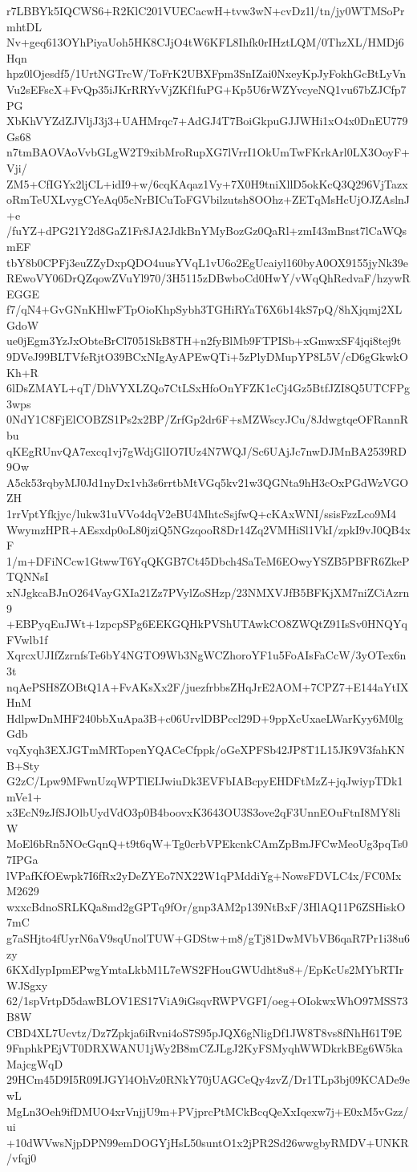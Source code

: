 r7LBBYk5IQCWS6+R2KlC201VUECacwH+tvw3wN+cvDz1l/tn/jy0WTMSoPrmhtDL
Nv+geq613OYhPiyaUoh5HK8CJjO4tW6KFL8Ihfk0rIHztLQM/0ThzXL/HMDj6Hqn
hpz0lOjesdf5/1UrtNGTrcW/ToFrK2UBXFpm3SnIZai0NxeyKpJyFokhGcBtLyVn
Vu2sEFscX+FvQp35iJKrRRYvVjZKf1fuPG+Kp5U6rWZYvcyeNQ1vu67bZJCfp7PG
XbKhVYZdZJVljJ3j3+UAHMrqc7+AdGJ4T7BoiGkpuGJJWHi1xO4x0DnEU779Gs68
n7tmBAOVAoVvbGLgW2T9xibMroRupXG7lVrrI1OkUmTwFKrkArl0LX3OoyF+Vji/
ZM5+CfIGYx2ljCL+idI9+w/6cqKAqaz1Vy+7X0H9tniXllD5okKcQ3Q296VjTazx
oRmTeUXLvygCYeAq05cNrBICuToFGVbilzutsh8OOhz+ZETqMsHcUjOJZAslnJ+e
/fuYZ+dPG21Y2d8GaZ1Fr8JA2JdkBnYMyBozGz0QaRl+zmI43mBnst7lCaWQsmEF
tbY8b0CPFj3euZZyDxpQDO4uusYVqL1vU6o2EgUcaiyl160byA0OX9155jyNk39e
REwoVY06DrQZqowZVuYl970/3H5115zDBwboCd0HwY/vWqQhRedvaF/hzywREGGE
f7/qN4+GvGNnKHlwFTpOioKhpSybh3TGHiRYaT6X6b14kS7pQ/8hXjqmj2XLGdoW
ue0jEgm3YzJxObteBrCl7051SkB8TH+n2fyBlMb9FTPISb+xGmwxSF4jqi8tej9t
9DVeJ99BLTVfeRjtO39BCxNIgAyAPEwQTi+5zPlyDMupYP8L5V/cD6gGkwkOKh+R
6lDsZMAYL+qT/DhVYXLZQo7CtLSxHfoOnYFZK1cCj4Gz5BtfJZI8Q5UTCFPg3wps
0NdY1C8FjElCOBZS1Ps2x2BP/ZrfGp2dr6F+sMZWscyJCu/8JdwgtqeOFRannRbu
qKEgRUnvQA7excq1vj7gWdjGlIO7IUz4N7WQJ/Sc6UAjJc7nwDJMnBA2539RD9Ow
A5ck53rqbyMJ0Jd1nyDx1vh3s6rrtbMtVGq5kv21w3QGNta9hH3cOxPGdWzVGOZH
1rrVptYfkjyc/lukw31uVVo4dqV2eBU4MhtcSsjfwQ+cKAxWNI/ssisFzzLco9M4
WwymzHPR+AEsxdp0oL80jziQ5NGzqooR8Dr14Zq2VMHiSl1VkI/zpkI9vJ0QB4xF
1/m+DFiNCcw1GtwwT6YqQKGB7Ct45Dbch4SaTeM6EOwyYSZB5PBFR6ZkePTQNNsI
xNJgkcaBJnO264VayGXIa21Zz7PVylZoSHzp/23NMXVJfB5BFKjXM7niZCiAzrn9
+EBPyqEuJWt+1zpcpSPg6EEKGQHkPVShUTAwkCO8ZWQtZ91IsSv0HNQYqFVwlb1f
XqrcxUJIfZzrnfsTe6bY4NGTO9Wb3NgWCZhoroYF1u5FoAIsFaCcW/3yOTex6n3t
nqAePSH8ZOBtQ1A+FvAKsXx2F/juezfrbbsZHqJrE2AOM+7CPZ7+E144aYtIXHnM
HdlpwDnMHF240bbXuApa3B+c06UrvlDBPccl29D+9ppXcUxaeLWarKyy6M0lgGdb
vqXyqh3EXJGTmMRTopenYQACeCfppk/oGeXPFSb42JP8T1L15JK9V3fahKNB+Sty
G2zC/Lpw9MFwnUzqWPTlEIJwiuDk3EVFbIABcpyEHDFtMzZ+jqJwiypTDk1mVe1+
x3EcN9zJfSJOlbUydVdO3p0B4boovxK3643OU3S3ove2qF3UnnEOuFtnI8MY8liW
MoEl6bRn5NOcGqnQ+t9t6qW+Tg0crbVPEkcnkCAmZpBmJFCwMeoUg3pqTs07IPGa
lVPafKfOEwpk7I6fRx2yDeZYEo7NX22W1qPMddiYg+NowsFDVLC4x/FC0MxM2629
wxxcBdnoSRLKQa8md2gGPTq9fOr/gnp3AM2p139NtBxF/3HlAQ11P6ZSHiskO7mC
g7aSHjto4fUyrN6aV9sqUnolTUW+GDStw+m8/gTj81DwMVbVB6qaR7Pr1i38u6zy
6KXdIypIpmEPwgYmtaLkbM1L7eWS2FHouGWUdht8u8+/EpKcUs2MYbRTIrWJSgxy
62/1spVrtpD5dawBLOV1ES17ViA9iGsqvRWPVGFI/oeg+OIokwxWhO97MSS73B8W
CBD4XL7Ucvtz/Dz7Zpkja6iRvni4oS7S95pJQX6gNligDf1JW8T8vs8fNhH61T9E
9FnphkPEjVT0DRXWANU1jWy2B8mCZJLgJ2KyFSMyqhWWDkrkBEg6W5kaMajcgWqD
29HCm45D9I5R09IJGYl4OhVz0RNkY70jUAGCeQy4zvZ/Dr1TLp3bj09KCADe9ewL
MgLn3Oeh9ifDMUO4xrVnjjU9m+PVjprcPtMCkBcqQeXxIqexw7j+E0xM5vGzz/ui
+10dWVwsNjpDPN99emDOGYjHsL50suntO1x2jPR2Sd26wwgbyRMDV+UNKR/vfqj0

